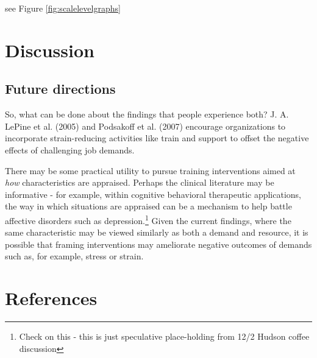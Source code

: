 \documentclass[
  man]{apa6}
\begin{document}
see Figure \ref{fig:scalelevelgraphs}

\newpage

\hypertarget{discussion}{%
\section{Discussion}\label{discussion}}

\hypertarget{future-directions}{%
\subsection{Future directions}\label{future-directions}}

So, what can be done about the findings that people experience both? J. A. LePine et al. (2005) and Podsakoff et al. (2007) encourage organizations to incorporate strain-reducing activities like train and support to offset the negative effects of challenging job demands.

There may be some practical utility to pursue training interventions aimed at \emph{how} characteristics are appraised. Perhaps the clinical literature may be informative - for example, within cognitive behavioral therapeutic applications, the way in which situations are appraised can be a mechanism to help battle affective disorders such as depression.\footnote{Check on this - this is just speculative place-holding from 12/2 Hudson coffee discussion} Given the current findings, where the same characteristic may be viewed similarly as both a demand and resource, it is possible that framing interventions may ameliorate negative outcomes of demands such as, for example, stress or strain.

\newpage

\hypertarget{references}{%
\section{References}\label{references}}

\begingroup
\setlength{\parindent}{-0.5in}
\setlength{\leftskip}{0.5in}
\end{document}
